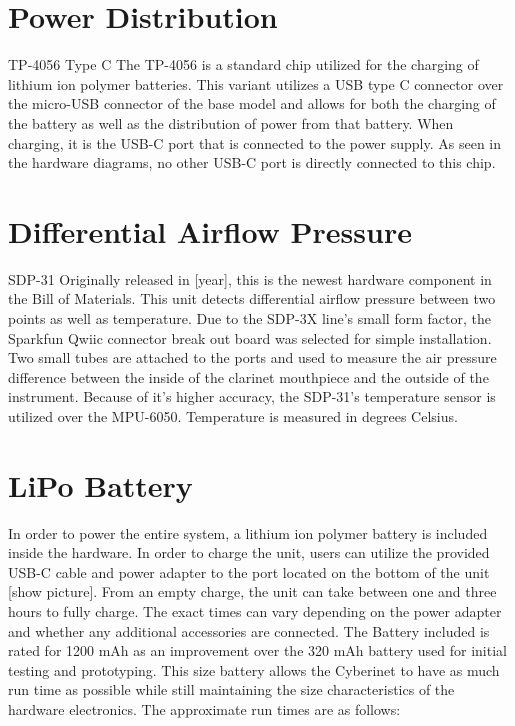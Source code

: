 \section{Power Distribution}
TP-4056 Type C
The TP-4056 is a standard chip utilized for the charging of lithium ion polymer batteries. This variant utilizes a USB type C connector over the micro-USB connector of the base model and allows for both the charging of the battery as well as the distribution of power from that battery. When charging, it is the USB-C port that is connected to the power supply. As seen in the hardware diagrams, no other USB-C port is directly connected to this chip.

\section{Differential Airflow Pressure}

SDP-31
Originally released in [year], this is the newest hardware component in the Bill of Materials. This unit detects differential airflow pressure between two points as well as temperature. Due to the SDP-3X line’s small form factor, the Sparkfun Qwiic connector break out board was selected for simple installation. Two small tubes are attached to the ports and used to measure the air pressure difference between the inside of the clarinet mouthpiece and the outside of the instrument.
Because of it’s higher accuracy, the SDP-31’s temperature sensor is utilized over the MPU-6050. Temperature is measured in degrees Celsius.

\section{LiPo Battery}
In order to power the entire system, a lithium ion polymer battery is included inside the hardware. In order to charge the unit, users can utilize the provided USB-C cable and power adapter to the port located on the bottom of the unit [show picture]. From an empty charge, the unit can take between one and three hours to fully charge. The exact times can vary depending on the power adapter and whether any additional accessories are connected. 
The Battery included is rated for 1200 mAh as an improvement over the 320 mAh battery used for initial testing and prototyping. This size battery allows the Cyberinet to have as much run time as possible while still maintaining the size characteristics of the hardware electronics. The approximate run times are as follows:

